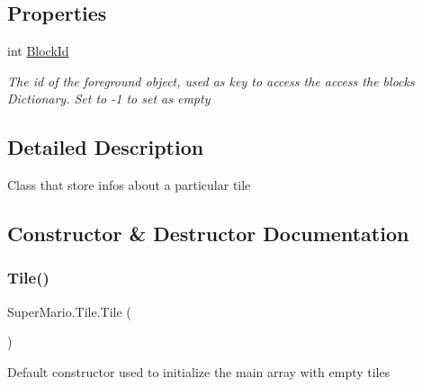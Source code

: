 \subsection*{Properties}
\begin{DoxyCompactItemize}
\item 
int \mbox{\hyperlink{class_super_mario_1_1_tile_a2bbfc4d23dcecaf5e3c1fee0501fae55}{Block\+Id}}
\begin{DoxyCompactList}\small\item\em The id of the foreground object, used as key to access the access the blocks Dictionary. Set to -\/1 to set as empty \end{DoxyCompactList}\end{DoxyCompactItemize}


\subsection{Detailed Description}
Class that store infos about a particular tile 



\subsection{Constructor \& Destructor Documentation}
\mbox{\label{class_super_mario_1_1_tile_a564fe1be7202cb3f3aadb75d38e6b993}} 
\subsubsection{\texorpdfstring{Tile()}{Tile()}\hspace{0.1cm}{\footnotesize\ttfamily [1/2]}}
{\footnotesize\ttfamily Super\+Mario.\+Tile.\+Tile (\begin{DoxyParamCaption}{ }\end{DoxyParamCaption})}



Default constructor used to initialize the main array with empty tiles 

\mbox{\label{class_super_mario_1_1_tile_a27450d36e4f8d7aa7bb8737eebd9aea8}} 
